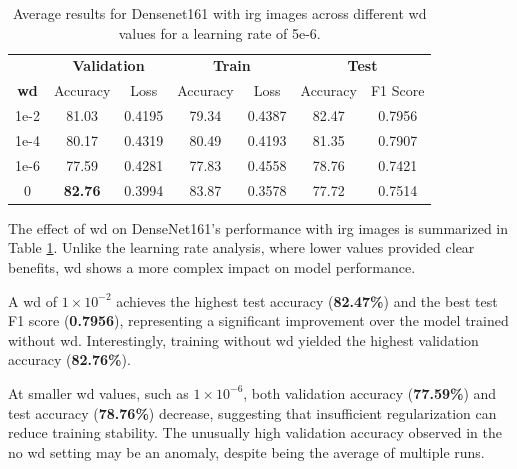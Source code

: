 \begin{table}[h]
    \centering
    \renewcommand{\arraystretch}{1.3}
    \setlength{\tabcolsep}{8pt}
    \begin{tabular}{|c|cccccc|}
        \hline
        & \multicolumn{2}{c}{\textbf{Validation}} & \multicolumn{2}{c}{\textbf{Train}} & \multicolumn{2}{c|}{\textbf{Test}} \\
        \textbf{\gls{wd}} & Accuracy & Loss & Accuracy & Loss & Accuracy & F1 Score \\
        \hline
        1e-2  & 81.03           & 0.4195 & 79.34 & 0.4387 & 82.47 & 0.7956 \\
        1e-4  & 80.17           & 0.4319 & 80.49 & 0.4193 & 81.35 & 0.7907 \\
        1e-6  & 77.59           & 0.4281 & 77.83 & 0.4558 & 78.76 & 0.7421 \\
        0     & \textbf{82.76}  & 0.3994 & 83.87 & 0.3578 & 77.72 & 0.7514 \\
        \hline
    \end{tabular}
    \caption{Average results for Densenet161 with \gls{irg} images across different \gls{wd} values for a learning rate of 5e-6.}
    \label{tab:densenet161_wd_irg}
\end{table}

The effect of \gls{wd} on DenseNet161's performance with \gls{irg} images is summarized in 
Table \ref{tab:densenet161_wd_irg}. Unlike the learning rate analysis, where lower values 
provided clear benefits, \gls{wd} shows a more complex impact on model performance.

A \gls{wd} of $1\times10^{-2}$ achieves the highest test accuracy (\textbf{82.47\%}) and the best 
test F1 score (\textbf{0.7956}), representing a significant improvement over the model trained 
without \gls{wd}. Interestingly, training without \gls{wd} yielded the highest validation 
accuracy (\textbf{82.76\%}).

At smaller \gls{wd} values, such as $1\times10^{-6}$, both validation accuracy
(\textbf{77.59\%}) and test accuracy (\textbf{78.76\%}) decrease, suggesting that insufficient 
regularization can reduce training stability. The unusually high validation accuracy observed 
in the no \gls{wd} setting may be an anomaly, despite being the average of multiple runs.



